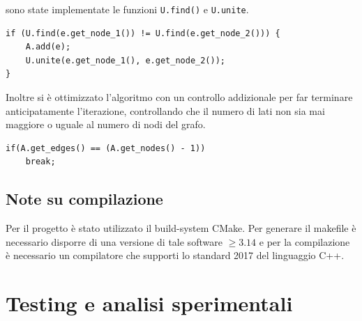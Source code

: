 \documentclass[]{article}
\begin{document}
\begin{flushleft}
\smallskip
sono state implementate le funzioni \verb|U.find()| e \verb|U.unite|.

\lstset{language=c++, style=mystyle, firstnumber=9} 	 	
\begin{lstlisting}
if (U.find(e.get_node_1()) != U.find(e.get_node_2())) {
	A.add(e);
    U.unite(e.get_node_1(), e.get_node_2());
}
\end{lstlisting}

\medskip
Inoltre si è ottimizzato l'algoritmo con un controllo addizionale per far terminare anticipatamente l'iterazione, controllando che il numero di lati non sia mai maggiore o uguale al numero di nodi del grafo.

\lstset{language=c++, style=mystyle, firstnumber=13}
\begin{lstlisting}
if(A.get_edges() == (A.get_nodes() - 1))
    break;
\end{lstlisting}
\end{flushleft}
\subsection{Note su compilazione}
Per il progetto è stato utilizzato il build-system CMake. Per generare il makefile è necessario disporre di una versione di tale software $\geq 3.14$ e per la compilazione è necessario un compilatore che supporti lo standard 2017 del linguaggio C++.
\newpage
\section{Testing e analisi sperimentali}
\end{document}
